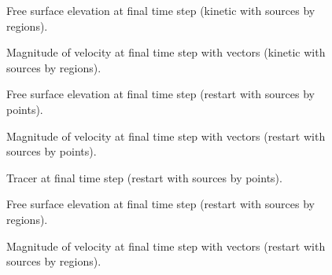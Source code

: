 \begin{figure}[H]
\centering
{}
\caption{Free surface elevation at final time step (kinetic with sources by regions).}
\label{t2d:init:freesurfkinreg}
\end{figure}

\begin{figure}[H]
\centering
{}
\caption{Magnitude of velocity at final time step with vectors (kinetic with sources by regions).}
\label{t2d:init:velovectkinreg}
\end{figure}

\begin{figure}[H]
\centering
{}
\caption{Free surface elevation at final time step (restart with sources by points).}
\label{t2d:init:freesurfrestart}
\end{figure}

\begin{figure}[H]
\centering
{}
\caption{Magnitude of velocity at final time step with vectors (restart with sources by points).}
\label{t2d:init:velovectrestart}
\end{figure}

\begin{figure}[H]
\centering
{}
\caption{Tracer at final time step (restart with sources by points).}
\label{t2d:init:tracerrestart}
\end{figure}

\begin{figure}[H]
\centering
{}
\caption{Free surface elevation at final time step (restart with sources by regions).}
\label{t2d:init:freesurfrestartreg}
\end{figure}

\begin{figure}[H]
\centering
{}
\caption{Magnitude of velocity at final time step with vectors (restart with sources by regions).}
\label{t2d:init:velovectrestartreg}
\end{figure}
